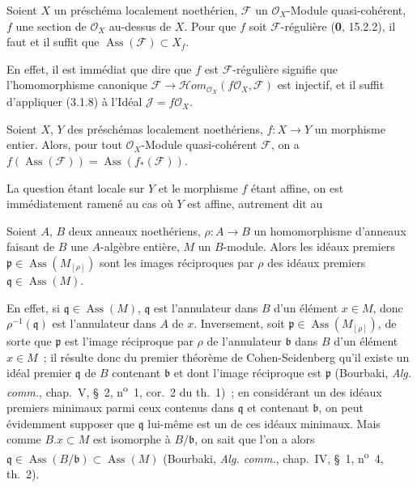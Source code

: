 \begin{corollary}[3.1.9]
\label{IV.2.3.1.9-fr}
Soient $X$ un préschéma localement noethérien, $\mathcal F$ un
$\mathcal O_X$-Module quasi-cohérent, $f$ une section de $\mathcal O_X$
au-dessus de $X$. Pour que $f$ soit $\mathcal F$-régulière
\textup{(\textbf{0}, 15.2.2)}, il faut et il suffit que
$\operatorname{Ass}(\mathcal F)\subset X_f$.
\end{corollary}

En effet, il est immédiat que dire que $f$ est $\mathcal F$-régulière signifie
que l'homomorphisme canonique
$\mathcal F\to\mathcal Hom_{\mathcal O_X}(f\mathcal O_X,\mathcal F)$ est
injectif, et il suffit d'appliquer (3.1.8) à l'Idéal
$\mathcal J=f\mathcal O_X$.

\begin{proposition}[3.1.10]
\label{IV.2.3.1.10-fr}
Soient $X$, $Y$ des préschémas localement noethériens, $f:X\to Y$ un
morphisme entier. Alors, pour tout $\mathcal O_X$-Module quasi-cohérent
$\mathcal F$, on a
$f(\operatorname{Ass}(\mathcal F))=\operatorname{Ass}(f_*(\mathcal F))$.
\end{proposition}

La question étant locale sur $Y$ et le morphisme $f$ étant affine, on est
immédiatement ramené au cas où $Y$ est affine, autrement dit au

\begin{lemma}[3.1.10.1]
\label{IV.2.3.1.10.1-fr}
Soient $A$, $B$ deux anneaux noethériens, $\rho:A\to B$ un homomorphisme
d'anneaux faisant de $B$ une $A$-algèbre entière, $M$ un $B$-module. Alors les
idéaux premiers $\mathfrak p\in\operatorname{Ass}(M_{[\rho]})$ sont les images
réciproques par $\rho$ des idéaux premiers
$\mathfrak q\in\operatorname{Ass}(M)$.
\end{lemma}

En effet, si $\mathfrak q\in\operatorname{Ass}(M)$, $\mathfrak q$ est
l'annulateur dans $B$ d'un élément $x\in M$, donc
$\rho^{-1}(\mathfrak q)$ est l'annulateur dans $A$ de $x$. Inversement, soit
$\mathfrak p\in\operatorname{Ass}(M_{[\rho]})$, de sorte que $\mathfrak p$
est l'image réciproque par $\rho$ de l'annulateur $\mathfrak b$ dans $B$ d'un
élément $x\in M$~; il résulte donc du premier théorème de Cohen-Seidenberg
qu'il existe un idéal premier $\mathfrak q$ de $B$ contenant $\mathfrak b$ et
dont l'image réciproque est $\mathfrak p$ (Bourbaki, \emph{Alg. comm.},
chap.~V, \S~2, n\textsuperscript{o}~1, cor.~2 du th.~1)~; en considérant un
des idéaux premiers minimaux parmi ceux contenus dans $\mathfrak q$ et
contenant $\mathfrak b$, on peut évidemment supposer que $\mathfrak q$
lui-même est un de ces idéaux minimaux. Mais comme $B.x\subset M$ est
isomorphe à $B/\mathfrak b$, on sait que l'on a alors
$\mathfrak q\in\operatorname{Ass}(B/\mathfrak b)\subset\operatorname{Ass}(M)$
(Bourbaki, \emph{Alg. comm.}, chap.~IV, \S~1, n\textsuperscript{o}~4,
th.~2).

